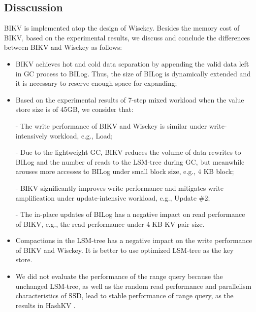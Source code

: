 \documentclass[sigconf]{acmart}
\begin{document}
\subsection{Disscussion}
BIKV is implemented atop the design of Wisckey. Besides the memory cost of BIKV, based on the experimental results, we discuss and conclude the differences between BIKV and Wisckey as follows:
\begin{itemize}
	\item BIKV achieves hot and cold data separation by appending the valid data left in GC process to BILog. Thus, the size of BILog is dynamically extended and it is necessary to reserve enough space for expanding;
	\item Based on the experimental results of 7-step mixed workload when the value store size is of 45GB, we consider that:
		\item[-] The write performance of BIKV and Wisckey is similar under write-intensively workload, e.g., Load;
		\item[-] Due to the lightweight GC, BIKV reduces the volume of data rewrites to BILog and the number of reads to the LSM-tree during GC, but meanwhile arouses more accesses to BILog under small block size, e.g., 4 KB block;
		\item[-] BIKV significantly improves write performance and mitigates write amplification under update-intensive workload, e.g., Update \#2;
		\item[-] The in-place updates of BILog has a negative impact on read performance of BIKV, e.g., the read performance under 4 KB KV pair size.
	\item Compactions in the LSM-tree has a negative impact on the write performance of BIKV and Wisckey. It is better to use optimized LSM-tree as the key store.
	\item We did not evaluate the performance of the range query because the unchanged LSM-tree, as well as the random read performance and parallelism characteristics of SSD, lead to stable performance of range query, as the results in HashKV \cite{HashKV}.
\end{itemize}
\end{document}
